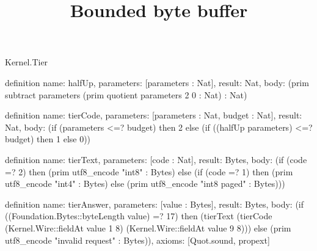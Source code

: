 \begin{lexlean}{Kernel.Tier}
\title{Bounded byte buffer}
\begin{semanticmodule}
definition{
  name: halfUp,
  parameters: [parameters : Nat],
  result: Nat,
  body: (prim subtract parameters (prim quotient parameters 2 0 : Nat) : Nat)
}

definition{
  name: tierCode,
  parameters: [parameters : Nat, budget : Nat],
  result: Nat,
  body: (if (parameters <=? budget) then 2 else (if ((halfUp parameters) <=? budget) then 1 else 0))
}

definition{
  name: tierText,
  parameters: [code : Nat],
  result: Bytes,
  body: (if (code =? 2) then (prim utf8_encode "int8" : Bytes) else (if (code =? 1) then (prim utf8_encode "int4" : Bytes) else (prim utf8_encode "int8 paged" : Bytes)))
}

definition{
  name: tierAnswer,
  parameters: [value : Bytes],
  result: Bytes,
  body: (if ((Foundation.Bytes::byteLength value) =? 17) then (tierText (tierCode (Kernel.Wire::fieldAt value 1 8) (Kernel.Wire::fieldAt value 9 8))) else (prim utf8_encode "invalid request" : Bytes)),
  axioms: [Quot.sound, propext]
}
\end{semanticmodule}
\end{lexlean}
